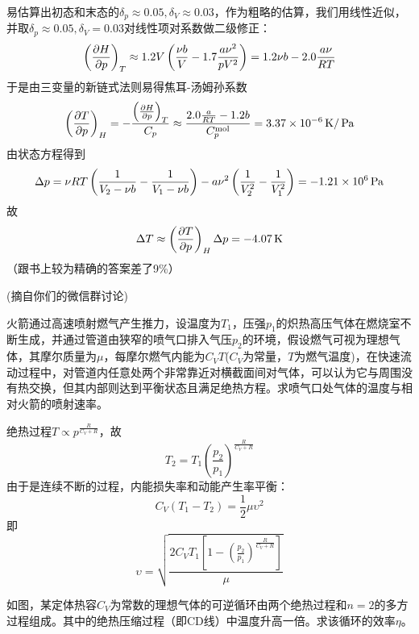 \documentclass[CJK]{beamer}
\begin{document}
\begin{frame}
  \bch
      {\scriptsize
        易估算出初态和末态的$\delta_p\approx 0.05, \delta_V \approx 0.03$，作为粗略的估算，我们用线性近似，并取$\delta_p\approx 0.05,\delta_V=0.03$对线性项对系数做二级修正：
        $$\left(\frac{\partial H}{\partial p}\right)_{T} \approx 1.2 V\left(\frac{\nu b}{V} - 1.7\frac{a\nu^2}{pV^2}\right) = 1.2 \nu b - 2.0\frac{a\nu}{RT}$$
        于是由三变量的新链式法则易得焦耳-汤姆孙系数
        $$\left(\frac{\partial T}{\partial p}\right)_{H} = -\frac{\left(\frac{\partial H}{\partial p}\right)_{T}}{C_p} \approx \frac{2.0\frac{a}{RT}-1.2b}{C_p^{\rm mol}} =  3.37\times 10^{-6}\,\mathrm{K}/\,\mathrm{Pa}$$
        由状态方程得到
        $$\Delta p = \nu RT\left(\frac{1}{V_2-\nu b}-\frac{1}{V_1-\nu b}\right) -a\nu^2\left(\frac{1}{V_2^2}-\frac{1}{V_1^2}\right)= -1.21\times 10^6\,\mathrm{Pa}$$
        故
        $$\Delta T \approx \left(\frac{\partial T}{\partial p}\right)_{H} \Delta p = -4.07\,\mathrm{K}$$
        （跟书上较为精确的答案差了9\%）
  }
  \ech
\end{frame}

\begin{frame}
  \chtitle{\proid (\sthree)}
  \bch
  (摘自你们的微信群讨论)

  火箭通过高速喷射燃气产生推力，设温度为$T_1$，压强$p_1$的炽热高压气体在燃烧室不断生成，并通过管道由狭窄的喷气口排入气压$p_2$的环境，假设燃气可视为理想气体，其摩尔质量为$\mu$，每摩尔燃气内能为$C_VT$($C_V$为常量，$T$为燃气温度)，在快速流动过程中，对管道内任意处两个非常靠近对横截面间对气体，可以认为它与周围没有热交换，但其内部则达到平衡状态且满足绝热方程。求喷气口处气体的温度与相对火箭的喷射速率。
  \ech
\end{frame}


\begin{frame}
  \bch
  绝热过程$T\propto p^{\frac{R}{C_V+R}}$，故
  $$T_2 = T_1\left(\frac{p_2}{p_1}\right)^{\frac{R}{C_V+R}}$$
  由于是连续不断的过程，内能损失率和动能产生率平衡：
  $$  C_V(T_1-T_2) =  \frac{1}{2}\mu\upsilon^2$$
  即
  $$\upsilon = \sqrt{\frac{2C_VT_1\left[1-\left(\frac{p_2}{p_1}\right)^{\frac{R}{C_V+R}}\right]}{\mu}}$$
  
  \ech
\end{frame}

\begin{frame}
  \chtitle{\proid (\stwo)}
  \bch

  如图，某定体热容$C_V$为常数的理想气体的可逆循环由两个绝热过程和$n=2$的多方过程组成。其中的绝热压缩过程（即CD线）中温度升高一倍。求该循环的效率$\eta$。
  \ech
\end{frame}
\end{document}
